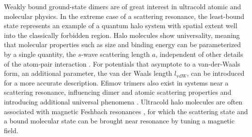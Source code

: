 Weakly bound ground-state dimers are of great interest in ultracold atomic and molecular physics. In the extreme case of a scattering resonance, the least-bound state represents an example of a quantum halo system \cite{jrf04} with spatial extent well into the classically forbidden region. Halo molecules show universality, meaning that molecular properties such as size and binding energy can be parameterized by a single quantity, the $s$-wave scattering length $a$, independent of other details of the atom-pair interaction \cite{kgj06,bha06}. For potentials that asymptote to a van-der-Waals form, an additional parameter, the van der Waals length $l_{\mathrm{vdW}}$, can be introduced for a more accurate description. Efimov trimers also exist in systems near a scattering resonance, influencing dimer and atomic scattering properties and introducing additional universal phenomena \cite{bha07,nen17}. Ultracold halo molecules are often associated with magnetic Feshbach resonances \cite{cgj10}, for which the scattering state and a bound molecular state can be brought near resonance by tuning a magnetic field.



